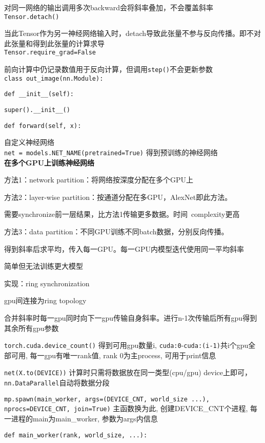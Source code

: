 \documentclass[UTF8]{ctexart}
\begin{document}
  对同一网络的输出调用多次backward会将斜率叠加，不会覆盖斜率\\
\texttt{Tensor.detach()}

  当此Tensor作为另一神经网络输入时，detach导致此张量不参与反向传播。即不对此张量和得到此张量的计算求导\\
\texttt{Tensor.require\_grad=False}

  前向计算中仍记录数值用于反向计算，但调用\texttt{step()}不会更新参数\\
\texttt{class out\_image(nn.Module):}

  \texttt{def \_\_init\_\_(self):}

  \quad \texttt{super().\_\_init\_\_()}

  \texttt{def forward(self, x):}

  \quad 自定义神经网络\\
\texttt{net = models.NET\_NAME(pretrained=True)} 得到预训练的神经网络\\
\textbf{在多个GPU上训练神经网络}

  方法1：network partition：将网络按深度分配在多个GPU上

  方法2：layer-wise partition：按通道分配在多GPU，AlexNet即此方法。
  
  \quad 需要synchronize前一层结果，比方法1传输更多数据。时间\ complexity更高

  方法3：data partition：不同GPU训练不同batch数据，分别反向传播。

  \quad 得到斜率后求平均，传入每一GPU。每一GPU内模型迭代使用同一平均斜率
  
  \quad 简单但无法训练更大模型

  \quad 实现：ring synchronization 

  \quad \quad gpu间连接为ring topology
  
  \quad \quad 合并斜率时每一gpu同时向下一gpu传输自身斜率。进行n-1次传输后所有gpu得到其余所有gpu参数
  
  \quad \texttt{torch.cuda.device\_count()} 得到可用gpu数量i, \texttt{cuda:0}-\texttt{cuda:(i-1)}共i个gpu全部可用, 每一gpu有唯一rank值, rank 0为主process, 可用于print信息

  \quad \texttt{net(X.to(DEVICE))} 计算时只需将数据放在同一类型(cpu/gpu) device上即可，\texttt{nn.DataParallel}自动将数据分段

  \quad \texttt{mp.spawn(main\_worker, args=(DEVICE\_CNT, world\_size ...), nprocs=DEVICE\_CNT, join=True)} 主函数换为此, 创建DEVICE\_CNT个进程, 每一进程的main为main\_worker, 参数为args内信息

  \quad \texttt{def main\_worker(rank, world\_size, ...):}
\end{document}
